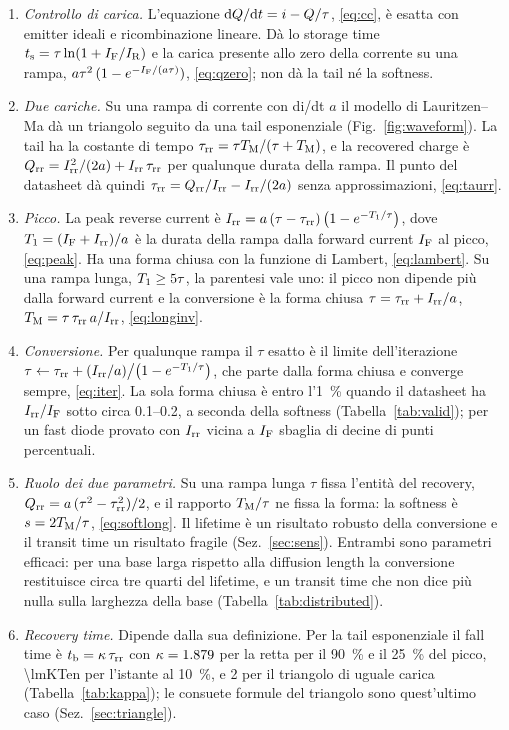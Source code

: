 \documentclass[10pt,a4paper]{scrartcl}
\let\newcommand\pdvaluedefine
\newcommand{\IF}{I_\mathrm{F}}
\newcommand{\IR}{I_\mathrm{R}}
\newcommand{\Irr}{I_\mathrm{rr}}
\newcommand{\Qrr}{Q_\mathrm{rr}}
\newcommand{\tb}{t_\mathrm{b}}
\newcommand{\ts}{t_\mathrm{s}}
\newcommand{\taurr}{\tau_\mathrm{rr}}
\newcommand{\TM}{T_\mathrm{M}}
\newcommand{\Tone}{T_1}
\newcommand{\diff}{\mathrm{d}}
\begin{document}
\begin{enumerate}
\item \emph{Controllo di carica.} L'equazione $\diff Q/\diff t = i - Q/\tau$, \eqref{eq:cc}, è esatta con emitter ideali e ricombinazione lineare. Dà lo storage time $\ts = \tau\ln(1+\IF/\IR)$ e la carica presente allo zero della corrente su una rampa, $a\tau^2\,(1-e^{-\IF/(a\tau)})$, \eqref{eq:qzero}; non dà la tail né la softness.
\item \emph{Due cariche.} Su una rampa di corrente con di/dt $a$ il modello di Lauritzen--Ma dà un triangolo seguito da una tail esponenziale (Fig.~\ref{fig:waveform}). La tail ha la costante di tempo $\taurr = \tau\TM/(\tau+\TM)$, e la recovered charge è $\Qrr = \Irr^2/(2a) + \Irr\,\taurr$ per qualunque durata della rampa. Il punto del datasheet dà quindi $\taurr = \Qrr/\Irr - \Irr/(2a)$ senza approssimazioni, \eqref{eq:taurr}.
\item \emph{Picco.} La peak reverse current è $\Irr = a\,(\tau-\taurr)\,\bigl(1-e^{-\Tone/\tau}\bigr)$, dove $\Tone = (\IF+\Irr)/a$ è la durata della rampa dalla forward current $\IF$ al picco, \eqref{eq:peak}. Ha una forma chiusa con la funzione di Lambert, \eqref{eq:lambert}. Su una rampa lunga, $\Tone \geq 5\tau$, la parentesi vale uno: il picco non dipende più dalla forward current e la conversione è la forma chiusa $\tau = \taurr + \Irr/a$, $\TM = \tau\,\taurr\,a/\Irr$, \eqref{eq:longinv}.
\item \emph{Conversione.} Per qualunque rampa il $\tau$ esatto è il limite dell'iterazione $\tau \leftarrow \taurr + (\Irr/a)\big/\bigl(1-e^{-\Tone/\tau}\bigr)$, che parte dalla forma chiusa e converge sempre, \eqref{eq:iter}. La sola forma chiusa è entro l'\SI{1}{\percent} quando il datasheet ha $\Irr/\IF$ sotto circa \numrange{0.1}{0.2}, a seconda della softness (Tabella~\ref{tab:valid}); per un fast diode provato con $\Irr$ vicina a $\IF$ sbaglia di decine di punti percentuali.
\item \emph{Ruolo dei due parametri.} Su una rampa lunga $\tau$ fissa l'entità del recovery, $\Qrr = a\,(\tau^2-\taurr^2)/2$, e il rapporto $\TM/\tau$ ne fissa la forma: la softness è $s = 2\TM/\tau$, \eqref{eq:softlong}. Il lifetime è un risultato robusto della conversione e il transit time un risultato fragile (Sez.~\ref{sec:sens}). Entrambi sono parametri efficaci: per una base larga rispetto alla diffusion length la conversione restituisce circa tre quarti del lifetime, e un transit time che non dice più nulla sulla larghezza della base (Tabella~\ref{tab:distributed}).
\item \emph{Recovery time.} Dipende dalla sua definizione. Per la tail esponenziale il fall time è $\tb = \kappa\,\taurr$ con $\kappa = 1.879$ per la retta per il \SI{90}{\percent} e il \SI{25}{\percent} del picco, \num{\lmKTen} per l'istante al \SI{10}{\percent}, e 2 per il triangolo di uguale carica (Tabella~\ref{tab:kappa}); le consuete formule del triangolo sono quest'ultimo caso (Sez.~\ref{sec:triangle}).

\end{enumerate}
\end{document}
